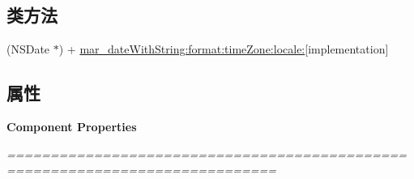 \subsection*{类方法}
\begin{DoxyCompactItemize}
\item 
(N\+S\+Date $\ast$) + \hyperlink{category_n_s_date_07_m_a_r_e_x_08_a880715cf7278a2889ec2e44c90eaf8c1}{mar\+\_\+date\+With\+String\+:format\+:time\+Zone\+:locale\+:}{\ttfamily  \mbox{[}implementation\mbox{]}}
\end{DoxyCompactItemize}
\subsection*{属性}
\begin{Indent}\textbf{ Component Properties}\par
{\em ============================================================================= 

}
\end{Indent}
